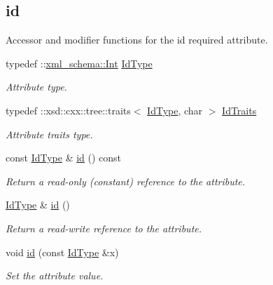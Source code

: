 \subsection*{id}
\label{_amgrpb80bb7740288fda1f201890375a60c8f}
Accessor and modifier functions for the id required attribute. \begin{DoxyCompactItemize}
\item 
\hypertarget{classopenstack_1_1xml_1_1ServerID_aa988a90cc3ff65df56778e87af119459}{
typedef ::\hyperlink{namespacexml__schema_a12d975a13061c938969b2b5143e97645}{xml\_\-schema::Int} \hyperlink{classopenstack_1_1xml_1_1ServerID_aa988a90cc3ff65df56778e87af119459}{IdType}}
\label{classopenstack_1_1xml_1_1ServerID_aa988a90cc3ff65df56778e87af119459}

\begin{DoxyCompactList}\small\item\em Attribute type. \item\end{DoxyCompactList}\item 
\hypertarget{classopenstack_1_1xml_1_1ServerID_adcbdd68fefbec0df94f3ab9872b9e98f}{
typedef ::xsd::cxx::tree::traits$<$ \hyperlink{classopenstack_1_1xml_1_1ServerID_aa988a90cc3ff65df56778e87af119459}{IdType}, char $>$ \hyperlink{classopenstack_1_1xml_1_1ServerID_adcbdd68fefbec0df94f3ab9872b9e98f}{IdTraits}}
\label{classopenstack_1_1xml_1_1ServerID_adcbdd68fefbec0df94f3ab9872b9e98f}

\begin{DoxyCompactList}\small\item\em Attribute traits type. \item\end{DoxyCompactList}\item 
const \hyperlink{classopenstack_1_1xml_1_1ServerID_aa988a90cc3ff65df56778e87af119459}{IdType} \& \hyperlink{classopenstack_1_1xml_1_1ServerID_a9605352bdd505beb130dfdcff8cb383e}{id} () const 
\begin{DoxyCompactList}\small\item\em Return a read-\/only (constant) reference to the attribute. \item\end{DoxyCompactList}\item 
\hyperlink{classopenstack_1_1xml_1_1ServerID_aa988a90cc3ff65df56778e87af119459}{IdType} \& \hyperlink{classopenstack_1_1xml_1_1ServerID_a8141bfa768e0916edf458a694ce48cfb}{id} ()
\begin{DoxyCompactList}\small\item\em Return a read-\/write reference to the attribute. \item\end{DoxyCompactList}\item 
void \hyperlink{classopenstack_1_1xml_1_1ServerID_a15ad6b544dd9329f9838d34e1090a276}{id} (const \hyperlink{classopenstack_1_1xml_1_1ServerID_aa988a90cc3ff65df56778e87af119459}{IdType} \&x)
\begin{DoxyCompactList}\small\item\em Set the attribute value. \item\end{DoxyCompactList}\end{DoxyCompactItemize}
